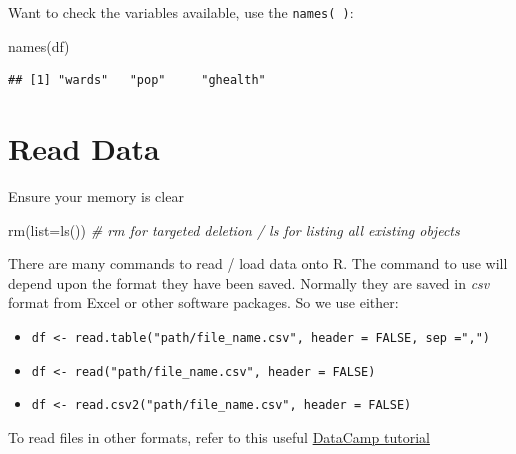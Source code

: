 \documentclass[
]{book}
\newenvironment{Shaded}{\begin{snugshade}}{\end{snugshade}}
\newcommand{\AttributeTok}[1]{\textcolor[rgb]{0.77,0.63,0.00}{#1}}
\newcommand{\CommentTok}[1]{\textcolor[rgb]{0.56,0.35,0.01}{\textit{#1}}}
\newcommand{\FunctionTok}[1]{\textcolor[rgb]{0.00,0.00,0.00}{#1}}
\newcommand{\NormalTok}[1]{#1}
\providecommand{\tightlist}{%
  \setlength{\itemsep}{0pt}\setlength{\parskip}{0pt}}
\begin{document}
Want to check the variables available, use the \texttt{names(\ )}:

\begin{Shaded}
\begin{Highlighting}[]
\FunctionTok{names}\NormalTok{(df)}
\end{Highlighting}
\end{Shaded}

\begin{verbatim}
## [1] "wards"   "pop"     "ghealth"
\end{verbatim}

\hypertarget{sec_readdata}{%
\section{Read Data}\label{sec_readdata}}

Ensure your memory is clear

\begin{Shaded}
\begin{Highlighting}[]
\FunctionTok{rm}\NormalTok{(}\AttributeTok{list=}\FunctionTok{ls}\NormalTok{()) }\CommentTok{\# rm for targeted deletion / ls for listing all existing objects}
\end{Highlighting}
\end{Shaded}

There are many commands to read / load data onto R. The command to use will depend upon the format they have been saved. Normally they are saved in \emph{csv} format from Excel or other software packages. So we use either:

\begin{itemize}
\tightlist
\item
  \texttt{df\ \textless{}-\ read.table("path/file\_name.csv",\ header\ =\ FALSE,\ sep\ =",")}
\item
  \texttt{df\ \textless{}-\ read("path/file\_name.csv",\ header\ =\ FALSE)}
\item
  \texttt{df\ \textless{}-\ read.csv2("path/file\_name.csv",\ header\ =\ FALSE)}
\end{itemize}

To read files in other formats, refer to this useful \href{https://www.datacamp.com/community/tutorials/r-data-import-tutorial?utm_source=adwords_ppc\&utm_campaignid=1655852085\&utm_adgroupid=61045434382\&utm_device=c\&utm_keyword=\%2Bread\%20\%2Bdata\%20\%2Br\&utm_matchtype=b\&utm_network=g\&utm_adpostion=1t1\&utm_creative=318880582308\&utm_targetid=kwd-309793905111\&utm_loc_interest_ms=\&utm_loc_physical_ms=9046551\&gclid=CjwKCAiA3uDwBRBFEiwA1VsajJO0QK0Jg7VipIt8_t82qQrnUliI0syAlh8CIxnE76Rb0kh3FbiehxoCzCgQAvD_BwE\#csv}{DataCamp tutorial}
\end{document}
